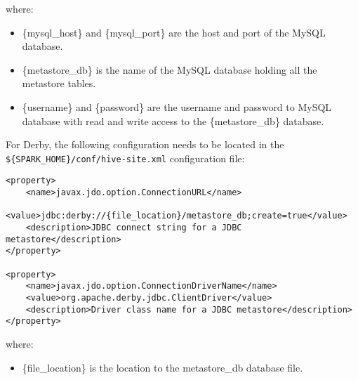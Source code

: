 where:
\begin{itemize}
\item \{mysql\_host\} and \{mysql\_port\} are the host and port of the MySQL database.
\item \{metastore\_db\} is the name of the MySQL database holding all the metastore tables.
\item \{username\} and \{password\} are the username and password to MySQL database with read and write access to the \{metastore\_db\} database.
\end{itemize}

For Derby, the following configuration needs to be located in the {\lstinline[style=Bash]|${SPARK_HOME}/conf/hive-site.xml|} configuration file:

\begin{lstlisting}[style=Bash]
<property>
    <name>javax.jdo.option.ConnectionURL</name>
    <value>jdbc:derby://{file_location}/metastore_db;create=true</value>
    <description>JDBC connect string for a JDBC metastore</description>
</property>

<property>
    <name>javax.jdo.option.ConnectionDriverName</name>
    <value>org.apache.derby.jdbc.ClientDriver</value>
    <description>Driver class name for a JDBC metastore</description>
</property>
\end{lstlisting}

where:
\begin{itemize}
\item \{file\_location\} is the location to the metastore\_db database file.
\end{itemize}